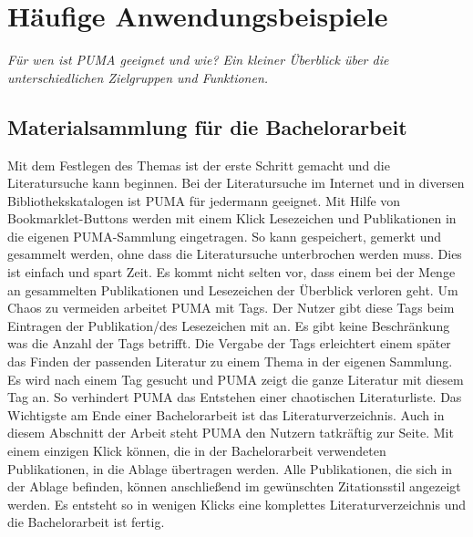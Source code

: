 \section{Häufige Anwendungsbeispiele}
\textit{Für wen ist PUMA geeignet und wie? Ein kleiner Überblick über die unterschiedlichen Zielgruppen und Funktionen.}
\subsection{Materialsammlung für die Bachelorarbeit}
Mit dem Festlegen des Themas ist der erste Schritt gemacht und die Literatursuche kann beginnen. Bei der Literatursuche im Internet und in diversen Bibliothekskatalogen ist PUMA für jedermann geeignet. Mit Hilfe von Bookmarklet-Buttons werden mit einem Klick Lesezeichen und Publikationen in die eigenen PUMA-Sammlung eingetragen. So kann gespeichert, gemerkt und gesammelt werden, ohne dass die Literatursuche unterbrochen werden muss. Dies ist einfach und spart Zeit. 
 \newline
Es kommt nicht selten vor, dass einem bei der Menge an gesammelten Publikationen und Lesezeichen der Überblick verloren geht. Um Chaos zu vermeiden arbeitet PUMA mit Tags. Der Nutzer gibt diese Tags beim Eintragen der Publikation/des Lesezeichen mit an. Es gibt keine Beschränkung was die Anzahl der Tags betrifft. Die Vergabe der Tags erleichtert einem später das Finden der passenden Literatur zu einem Thema in der eigenen Sammlung. Es wird nach einem Tag gesucht und PUMA zeigt die ganze Literatur mit diesem Tag an. So verhindert PUMA das Entstehen einer chaotischen Literaturliste.
 \newline
Das Wichtigste am Ende einer Bachelorarbeit ist das Literaturverzeichnis. Auch in diesem Abschnitt der Arbeit steht PUMA den Nutzern tatkräftig zur Seite. Mit einem einzigen Klick können, die in der Bachelorarbeit verwendeten Publikationen, in die Ablage übertragen werden. Alle Publikationen, die sich in der Ablage befinden, können anschließend im gewünschten Zitationsstil  angezeigt werden. Es entsteht so in wenigen Klicks eine komplettes Literaturverzeichnis und die  Bachelorarbeit ist fertig.
 
